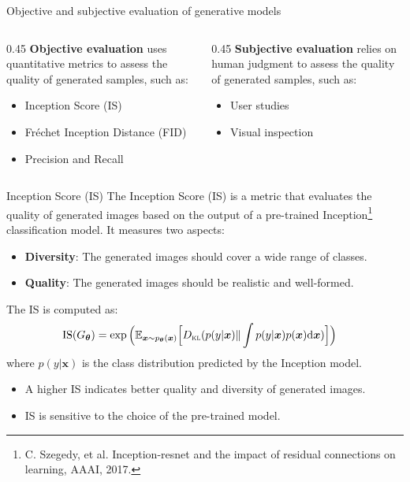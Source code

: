 \documentclass[11pt,aspectratio=169,usenames,dvipsnames]{beamer}
\newcommand{\bs}{\boldsymbol}
\begin{document}
\begin{frame}{Objective and subjective evaluation of generative models}
  \begin{columns}
  \begin{column}{0.45\textwidth}
  \textbf{Objective evaluation} uses quantitative metrics to assess the quality of generated samples, such as:
    \begin{itemize}
    \item Inception Score (IS)
    \item Fréchet Inception Distance (FID)
    \item Precision and Recall
    \end{itemize}
  \end{column}
  \begin{column}{0.45\textwidth}
   \textbf{Subjective evaluation} relies on human judgment to assess the quality of generated samples, such as:
    \begin{itemize}
    \item User studies
    \item Visual inspection
    \end{itemize}
  \end{column}
  \end{columns}
\end{frame}

\begin{frame}{Inception Score (IS)}
  The Inception Score (IS) is a metric that evaluates the quality of generated images based on the output of a pre-trained Inception\footnote{C. Szegedy, et al. Inception-resnet and the impact of residual connections on learning, AAAI, 2017.\vspace{-5mm}} classification model. It measures two aspects:
  \begin{itemize}
  \item \textbf{Diversity}: The generated images should cover a wide range of classes.
  \item \textbf{Quality}: The generated images should be realistic and well-formed.
  \end{itemize}
  The IS is computed as:
  \begin{align*}
  \text{IS}(G_{\bs{\theta}}) &= \exp\Big(\mathbb{E}_{\bs{x}\sim p_{\bs{\theta}}(\bs{x})}\Big[D_{\textsc{kl}}(p(y|\bs{x})\|\int p(y|\bs{x})p(\bs{x}) \textrm{d}\bs{x})\Big]\Big)
  \end{align*}
  where $p(y|\bs{x})$ is the class distribution predicted by the Inception model.
  \begin{itemize}
  \item A higher IS indicates better quality and diversity of generated images.
  \item IS is sensitive to the choice of the pre-trained model.
  \end{itemize}\vspace{3mm}
\end{frame} 
\end{document}
